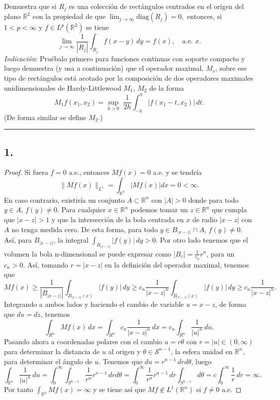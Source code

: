 \documentclass[11pt,a4paper]{article}
\begin{document}
    Demuestra que si $R_j$ es una colección de rectángulos centrados en el origen del plano $\mathbb R^2$ con la propiedad de que $\displaystyle \lim_{j\to\infty} \mbox{diag}(R_j)= 0,$ entonces, si $1<p<\infty$ y $f\in L^p(\mathbb R^2)$ se tiene
 $$
 \lim_{j\to\infty}\frac 1{|R_j|}\int_{R_j} f(x-y)\, dy = f(x), \quad \mbox{a.e. }  x.
 $$
 {\it Indicación}: Pruébalo primero para funciones continuas con soporte compacto y luego demuestra (y usa a continuación) que el operador maximal, $M_s$, sobre ese tipo de rectángulos está acotado por la composición de dos operadores maximales unidimensionales de Hardy-Littlewood $M_1, \, M_2$ de la forma
 $$
 M_1f(x_1,x_2)=\sup_{h>0}\; \frac1{2h}\int_{-h}^{h}|f(x_1-t,x_2)|\, dt.
 $$
 (De forma similar se define $M_2$.)
   
\vskip 6mm
\hrule
\vskip 5mm

\newpage
{} 

\subsection*{1.}
\begin{proof}
  Si fuera $ f = 0 $ a.e., entonces $ Mf(x) = 0 $ a.e. y se tendría
  $$
    \| Mf(x) \|_{L^1} = \int_{\mathbb R^n} |Mf(x)| dx = 0 < \infty.
  $$
  En caso contrario, existiría un conjunto $ A \subset \mathbb R^n $ con $ |A| > 0 $ donde para todo $ y \in A $, $ f(y) \neq 0 $. Para cualquier $ x \in \mathbb R^n $ podemos tomar un $ z \in \mathbb R^n $ que cumpla que $ |x-z| > 1 $ y que la intersección de la bola centrada en $ x $ de radio $ |x-z| $ con $ A $ no tenga medida cero. De esta forma, para todo $ y \in  B_{|x-z|} \cap A $, $ f(y) \neq 0 $. Así, para $ B_{|x-z|} $, la integral 
  $
    \int_{B_{|x-z|}} |f(y)|\, dy > 0.
  $
  Por otro lado tenemos que el volumen la bola n-dimensional se puede expresar como
  $ |B_r| = \frac{1}{c_n} r^n $, para un $c_n > 0 $. Así, tomando $ r = |x-z| $ en la definición del operador maximal, tenemos que
  $$
    Mf(x) \geq \frac{1}{|B_{|x-z|}|} \int_{B_{|x-z|}(x)} |f(y)|\, dy \geq c_n \frac{1}{|x-z|^n} \int_{B_{|x-z|}(x)} |f(y)|\, dy \geq c_n \frac{1}{|x-z|^n}.
  $$
  Integrando a ambos lados y haciendo el cambio de variable $ u = x - z $, de forma que $ du = dz $, tenemos
  $$
    \int_{R^n} Mf(x) \, dx = \int_{R^n} c_n \frac{1}{|x-z|^n} \, dx = c_n \int_{R^n} \frac{1}{|u|^n} \, du.
  $$
  Pasando ahora a coordenadas polares con el cambio $ u = r\theta $ con $ r = |u| \in (0, \infty)$ para determinar la distancia de $ u $ al origen y $ \theta \in \mathcal S^{n-1} $, la esfera unidad en $ \mathbb R^n $, para determinar el ángulo de $ u $. Tenemos que $ du = r^{n-1} \, dr d\theta $, luego
  $$
    \int_{\mathbb R^n} \frac{1}{|u|^n} \, du = \int_{0}^\infty \int_{S^{n-1}} \frac{1}{r^n} r^{n-1} \, dr d\theta = \int_{0}^\infty \frac{1}{r^n} r^{n-1} \, dr \int_{S^{n-1}} d\theta = c \int_{0}^\infty \frac{1}{r} \, dr = \infty.
  $$
  Por tanto $ \int_{\mathbb R^n} Mf(x) = \infty $ y se tiene así que $ Mf \notin L^1(\mathbb R^n)$ si $f \neq 0$ a.e.
\end{proof}
\end{document}
